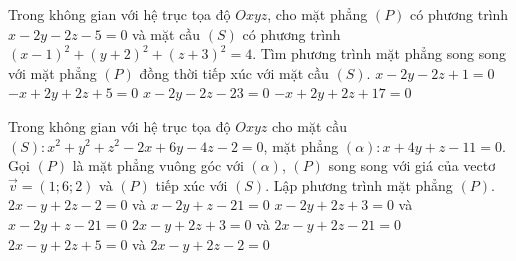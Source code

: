 \begin{ex}%
	Trong không gian với hệ trục tọa độ $Oxyz$, cho mặt phẳng $(P)$ có phương trình $x-2y-2z-5=0$ và mặt cầu $(S)$ có phương trình $(x-1)^2+(y+2)^2+(z+3)^2=4$. Tìm phương trình mặt phẳng song song với mặt phẳng $(P)$ đồng thời tiếp xúc với mặt cầu $(S)$.
	\choice
	{$x-2y-2z+1=0$}
	{$-x+2y+2z+5=0$}
	{$x-2y-2z-23=0$}
	{\True $-x+2y+2z+17=0$}
\end{ex}
\begin{ex}%
	Trong không gian với hệ trục tọa độ $Oxyz$ cho mặt cầu $(S)\colon x^2+y^2+z^2-2x+6y-4z-2=0$, mặt phẳng $(\alpha)\colon x+4y+z-11=0$. Gọi $(P)$ là mặt phẳng vuông góc với $(\alpha)$, $(P)$ song song với giá của vectơ $\overrightarrow{v}=(1;6;2)$ và $(P)$ tiếp xúc với $(S)$. Lập phương trình mặt phẳng $(P)$.
	\choice
	{$2x-y+2z-2=0$ và $x-2y+z-21=0$}
	{$x-2y+2z+3=0$ và $x-2y+z-21=0$}
	{\True $2x-y+2z+3=0$ và $2x-y+2z-21=0$}
	{$2x-y+2z+5=0$ và $2x-y+2z-2=0$}
\end{ex}
